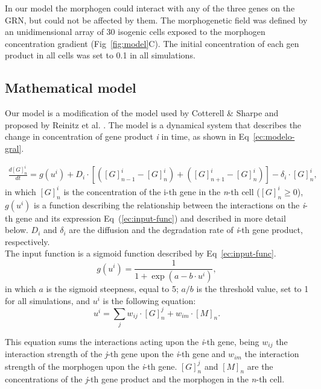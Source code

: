 \documentclass[10pt,letterpaper]{article}
\begin{document}
In our model the morphogen could interact with any of the three genes on the
GRN, but could not be affected by them. The morphogenetic field was defined by
an unidimensional array of 30 isogenic cells exposed to the morphogen
concentration gradient (Fig~\ref{fig:model}C). The initial concentration of
each gen product in all cells was set to 0.1 in all simulations.\\

\subsection*{Mathematical model}

Our model is a modification of the model used by Cotterell \& Sharpe
\cite{Cotterell2010} and proposed by Reinitz et al. \cite{Reinitz1995}. The
model is a dynamical system that describes the change in concentration of gene
product \emph{i} in time, as shown in Eq~\ref{ec:modelo-gral}.

 \begin{eqnarray}
  \frac{d[G]^i_n}{dt}
  = g(u^i) + D_i \cdot [ ([G]^i_{n-1}-[G]^i_n) +([G]^i_{n+1}-[G]^i_n)]-\delta_i
  \cdot [ G ]^i_n ,
  \label{ec:modelo-gral}
 \end{eqnarray}
\noindent
in which $[G]^{i}_{n}$ is the concentration of the i-th gene in the \emph{n}-th
cell ($[G]^{i}_{n} ≥ 0$), $g(u^i)$ is a function describing the relationship
between the interactions on the \emph{i}-th gene and its expression
Eq~(\ref{ec:input-func}) and described in more detail below. $D_i$ and
$\delta_i$ are the diffusion and the degradation rate of \emph{i}-th gene
product, respectively.\\

The input function is a sigmoid function described by Eq~\ref{ec:input-func}.
\begin{equation}
 g(u^i) = \frac{1}{1 + \exp(a - b \cdot u^i)},
 \label{ec:input-func}
\end{equation}
\noindent
in which $a$ is the sigmoid steepness, equal to 5; $a/b$ is the threshold value,
set to 1 for all simulations, and $u^i$ is the following equation:
\begin{equation}
 u^i = \sum_j w_{ij} \cdot [G]^j_n + w_{im} \cdot [M]_n.
 \label{ec:mat-sum}
\end{equation}

This equation sums the interactions acting upon the \emph{i}-th gene, being
$w_{ij}$ the interaction strength of the \emph{j}-th gene upon the \emph{i}-th
gene and $w_{im}$ the interaction strength of the morphogen upon the \emph{i}-th
gene. $[G]^j_n$ and $[M]_n$ are the concentrations of the \emph{j}-th gene
product and the morphogen in the \emph{n}-th cell.
\end{document}
